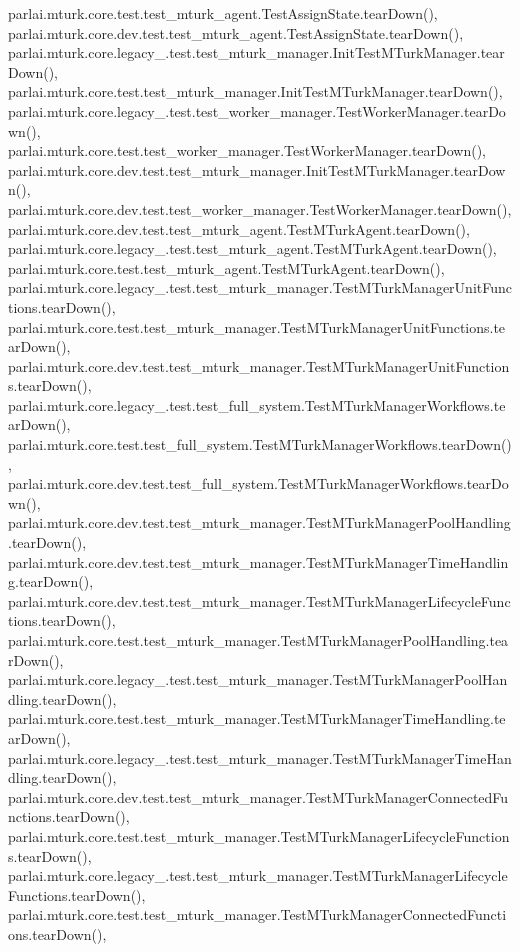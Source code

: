 parlai.\+mturk.\+core.\+test.\+test\+\_\+mturk\+\_\+agent.\+Test\+Assign\+State.\+tear\+Down(), parlai.\+mturk.\+core.\+dev.\+test.\+test\+\_\+mturk\+\_\+agent.\+Test\+Assign\+State.\+tear\+Down(), parlai.\+mturk.\+core.\+legacy\+\_.\+test.\+test\+\_\+mturk\+\_\+manager.\+Init\+Test\+M\+Turk\+Manager.\+tear\+Down(), parlai.\+mturk.\+core.\+test.\+test\+\_\+mturk\+\_\+manager.\+Init\+Test\+M\+Turk\+Manager.\+tear\+Down(), parlai.\+mturk.\+core.\+legacy\+\_.\+test.\+test\+\_\+worker\+\_\+manager.\+Test\+Worker\+Manager.\+tear\+Down(), parlai.\+mturk.\+core.\+test.\+test\+\_\+worker\+\_\+manager.\+Test\+Worker\+Manager.\+tear\+Down(), parlai.\+mturk.\+core.\+dev.\+test.\+test\+\_\+mturk\+\_\+manager.\+Init\+Test\+M\+Turk\+Manager.\+tear\+Down(), parlai.\+mturk.\+core.\+dev.\+test.\+test\+\_\+worker\+\_\+manager.\+Test\+Worker\+Manager.\+tear\+Down(), parlai.\+mturk.\+core.\+dev.\+test.\+test\+\_\+mturk\+\_\+agent.\+Test\+M\+Turk\+Agent.\+tear\+Down(), parlai.\+mturk.\+core.\+legacy\+\_.\+test.\+test\+\_\+mturk\+\_\+agent.\+Test\+M\+Turk\+Agent.\+tear\+Down(), parlai.\+mturk.\+core.\+test.\+test\+\_\+mturk\+\_\+agent.\+Test\+M\+Turk\+Agent.\+tear\+Down(), parlai.\+mturk.\+core.\+legacy\+\_.\+test.\+test\+\_\+mturk\+\_\+manager.\+Test\+M\+Turk\+Manager\+Unit\+Functions.\+tear\+Down(), parlai.\+mturk.\+core.\+test.\+test\+\_\+mturk\+\_\+manager.\+Test\+M\+Turk\+Manager\+Unit\+Functions.\+tear\+Down(), parlai.\+mturk.\+core.\+dev.\+test.\+test\+\_\+mturk\+\_\+manager.\+Test\+M\+Turk\+Manager\+Unit\+Functions.\+tear\+Down(), parlai.\+mturk.\+core.\+legacy\+\_.\+test.\+test\+\_\+full\+\_\+system.\+Test\+M\+Turk\+Manager\+Workflows.\+tear\+Down(), parlai.\+mturk.\+core.\+test.\+test\+\_\+full\+\_\+system.\+Test\+M\+Turk\+Manager\+Workflows.\+tear\+Down(), parlai.\+mturk.\+core.\+dev.\+test.\+test\+\_\+full\+\_\+system.\+Test\+M\+Turk\+Manager\+Workflows.\+tear\+Down(), parlai.\+mturk.\+core.\+dev.\+test.\+test\+\_\+mturk\+\_\+manager.\+Test\+M\+Turk\+Manager\+Pool\+Handling.\+tear\+Down(), parlai.\+mturk.\+core.\+dev.\+test.\+test\+\_\+mturk\+\_\+manager.\+Test\+M\+Turk\+Manager\+Time\+Handling.\+tear\+Down(), parlai.\+mturk.\+core.\+dev.\+test.\+test\+\_\+mturk\+\_\+manager.\+Test\+M\+Turk\+Manager\+Lifecycle\+Functions.\+tear\+Down(), parlai.\+mturk.\+core.\+test.\+test\+\_\+mturk\+\_\+manager.\+Test\+M\+Turk\+Manager\+Pool\+Handling.\+tear\+Down(), parlai.\+mturk.\+core.\+legacy\+\_.\+test.\+test\+\_\+mturk\+\_\+manager.\+Test\+M\+Turk\+Manager\+Pool\+Handling.\+tear\+Down(), parlai.\+mturk.\+core.\+test.\+test\+\_\+mturk\+\_\+manager.\+Test\+M\+Turk\+Manager\+Time\+Handling.\+tear\+Down(), parlai.\+mturk.\+core.\+legacy\+\_.\+test.\+test\+\_\+mturk\+\_\+manager.\+Test\+M\+Turk\+Manager\+Time\+Handling.\+tear\+Down(), parlai.\+mturk.\+core.\+dev.\+test.\+test\+\_\+mturk\+\_\+manager.\+Test\+M\+Turk\+Manager\+Connected\+Functions.\+tear\+Down(), parlai.\+mturk.\+core.\+test.\+test\+\_\+mturk\+\_\+manager.\+Test\+M\+Turk\+Manager\+Lifecycle\+Functions.\+tear\+Down(), parlai.\+mturk.\+core.\+legacy\+\_.\+test.\+test\+\_\+mturk\+\_\+manager.\+Test\+M\+Turk\+Manager\+Lifecycle\+Functions.\+tear\+Down(), parlai.\+mturk.\+core.\+test.\+test\+\_\+mturk\+\_\+manager.\+Test\+M\+Turk\+Manager\+Connected\+Functions.\+tear\+Down(), 